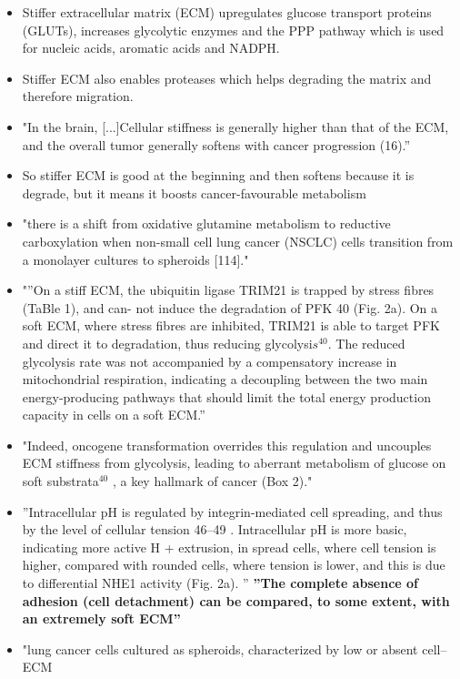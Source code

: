 \documentclass[11pt,a4paper]{article}
\begin{document}
\begin{itemize}
\item Stiffer extracellular matrix (ECM) upregulates glucose transport proteins (GLUTs), increases glycolytic enzymes and the PPP pathway which is used for nucleic acids, aromatic acids and NADPH. \cite{Onwudiwe2022}
\item Stiffer ECM also enables proteases which helps degrading the matrix and therefore migration. \cite{Onwudiwe2022}
\item "In the brain, [...]Cellular stiffness is generally higher than that of the ECM, and the overall tumor generally softens with cancer progression (16).”\cite{Onwudiwe2022}
\item So stiffer ECM is good at the beginning and then softens because it is degrade, but it means it boosts cancer-favourable metabolism \cite{Onwudiwe2022}\cite{Oh2017}\cite{Romani2020}
\item "there is a shift from oxidative glutamine metabolism to reductive carboxylation when non-small cell lung cancer (NSCLC) cells transition from a monolayer cultures to spheroids [114]." \cite{Natarajan2019}\cite{Jiang2016}
\item "”On a stiff ECM, the ubiquitin ligase TRIM21 is trapped by stress fibres (TaBle 1),
and can- not induce the degradation of PFK 40 (Fig. 2a). On a soft ECM, where stress fibres are inhibited, TRIM21 is able to target PFK and direct it to degradation, thus reducing glycolysi$s^{40}$. The reduced glycolysis rate was not accompanied by a compensatory increase in mitochondrial respiration, indicating a decoupling between the two main energy-producing pathways that should limit the total energy production capacity in cells on a soft ECM.”\cite{Romani2020}
\item "Indeed, oncogene transformation overrides this regulation and uncouples ECM stiffness from glycolysis, leading to aberrant metabolism of glucose on soft substrata$^{40}$ , a key hallmark of cancer (Box 2)."\cite{Romani2020}
\item ”Intracellular pH is regulated by integrin-mediated cell spreading, and thus by the level of cellular tension 46–49 . Intracellular pH is more basic, indicating more active H
+ extrusion, in spread cells, where cell tension is higher, compared with rounded cells, where tension is lower, and this is due to differential NHE1 activity (Fig. 2a). ”\cite{Romani2020}
\textbf{”The complete absence of adhesion (cell detachment) can be compared, to some extent, with an extremely soft ECM”}\cite{Romani2020}
\item "lung cancer cells cultured as spheroids, characterized by low or absent cell–ECM

\end{itemize}
\end{document}
